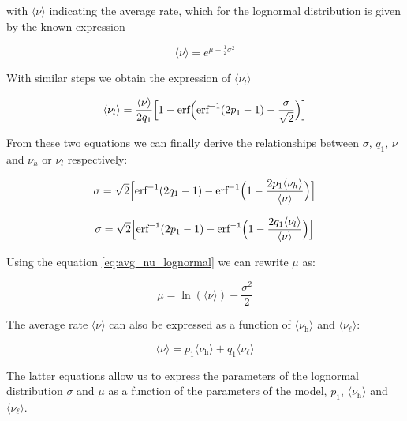 \documentclass[a4paper, 12pt, twoside, openright]{book}
\newcommand{\rh}{\nu_\text{h}}
\newcommand{\rl}{\nu_{\ell}}
\begin{document}
with $\langle \nu \rangle$ indicating the average rate, which for the lognormal distribution is given by the known expression

\begin{equation}
\label{eq:avg_nu_lognormal}
\langle \nu \rangle = e^{\mu + \frac{1}{2}\sigma^2}
\end{equation}

With similar steps we obtain the expression of
$\langle \nu_l \rangle$

\begin{equation}
    \langle \nu_l \rangle= \frac{\langle \nu \rangle }
    {2 q_1}\Bigl[1- \text{erf} \Bigl(\text{erf}^{-1}(2p_1-1) -\frac{\sigma}{\sqrt{2}}\Bigr) \Bigr] 
\end{equation}

From these two equations we can finally derive the relationships between $\sigma$, $q_1$, $\nu$ and $\nu_h$ or $\nu_l$ respectively:

\begin{equation}
    \sigma= \sqrt{2} \Bigl[ \text{erf}^{-1} ( 2 q_1 - 1) -
    \text{erf}^{-1} \Bigl( 1 -
    {\frac{2 p_1 \langle \nu_h \rangle}
    {\langle \nu \rangle}} \Bigr) \Bigr]
\end{equation}

\begin{equation}
    \sigma= \sqrt{2} \Bigl[ \text{erf}^{-1} ( 2 p_1 - 1) -
    \text{erf}^{-1} \Bigl( 1 -
    {\frac{2 q_1 \langle \nu_l \rangle}
    {\langle \nu \rangle}} \Bigr) \Bigr]
\end{equation}


Using the equation \eqref{eq:avg_nu_lognormal} we can rewrite $\mu$ as:

\begin{equation}
    \mu= \ln(\langle \nu \rangle) -\frac{\sigma^2}{2}
\end{equation}

The average rate $\langle \nu \rangle$
can also be expressed as a function of
$\langle \rh \rangle$ and $\langle \rl \rangle$:

\begin{equation}
    \langle \nu \rangle = p_1 \langle \rh \rangle +
    q_1 \langle \rl \rangle
\end{equation}

The latter equations allow us to express the parameters of the lognormal distribution $\sigma$ and $\mu$ as a function of the parameters of the model,
$p_1$,  $\langle \rh \rangle$ and $\langle \rl \rangle$.
\end{document}
